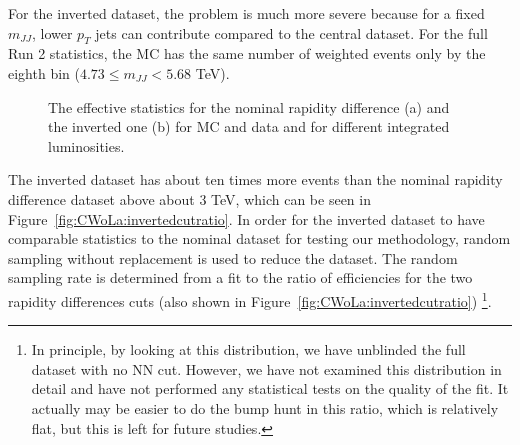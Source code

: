 For the inverted dataset, the problem is much more severe because for a fixed $m_{JJ}$, lower $p_T$ jets can contribute compared to the central dataset.
For the full Run 2 statistics, the MC has the same number of weighted events only by the eighth bin ($4.73 \le m_{JJ} < 5.68$ TeV).

\begin{figure}[h!]
\centering
{}
\caption{The effective statistics for the nominal rapidity difference (a) and the inverted one (b) for MC and data and for different integrated luminosities.}
\label{fig:CWoLa:effectivestats}
\end{figure}

The inverted dataset has about ten times more events than the nominal rapidity difference dataset above about 3 TeV, which can be seen in Figure~\ref{fig:CWoLa:invertedcutratio}.
In order for the inverted dataset to have comparable statistics to the nominal dataset for testing our methodology, random sampling without replacement is used to reduce the dataset.
The random sampling rate is determined from a fit to the ratio of efficiencies for the two rapidity differences cuts (also shown in Figure~\ref{fig:CWoLa:invertedcutratio})
\footnote{In principle, by looking at this distribution, we have unblinded the full dataset with no NN cut.  However, we have not examined this distribution in detail and have not performed any statistical tests on the quality of the fit.  It actually may be easier to do the bump hunt in this ratio, which is relatively flat, but this is left for future studies.}.

